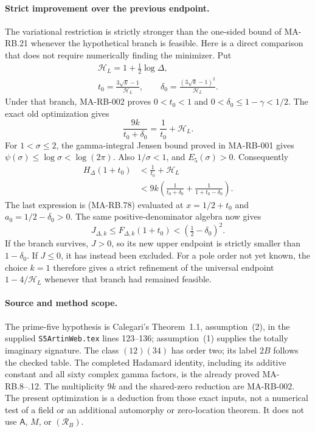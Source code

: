 \paragraph{Strict improvement over the previous endpoint.}
The variational restriction is strictly stronger than the
one-sided bound of MA-RB.21 whenever the hypothetical
branch is feasible.  Here is a direct comparison that
does not require numerically finding the minimizer.
Put
\[
 \begin{gathered}
 \mathcal H_L=1+\tfrac12\log\Delta,\\
 t_0=\frac{3\sqrt{k}-1}{\mathcal H_L},\qquad
 \delta_0=\frac{(3\sqrt{k}-1)^2}{\mathcal H_L}.
 \end{gathered}
 \tag{MA-RB.81}
\]
Under that branch, MA-RB-002 proves \(0<t_0<1\)
and \(0<\delta_0\le1-\gamma<1/2\).
The exact old optimization gives
\[
              \frac{9k}{t_0+\delta_0}
                            =\frac1{t_0}+\mathcal H_L.
 \tag{MA-RB.82}
\]
For \(1<\sigma\le2\), the gamma-integral Jensen
bound proved in MA-RB-001 gives
\(\psi(\sigma)\le\log\sigma<\log(2\pi)\).
Also \(1/\sigma<1\), and \(E_5(\sigma)>0\).
Consequently
\[
 \begin{split}
 H_\Delta(1+t_0)&<\frac1{t_0}+\mathcal H_L\\
       &<9k\left(\frac1{t_0+\delta_0}
                         +\frac1{1+t_0-\delta_0}\right).
 \end{split}
 \tag{MA-RB.83}
\]
The last expression is (MA-RB.78) evaluated at
\(x=1/2+t_0\) and \(a_0=1/2-\delta_0>0\).
The same positive-denominator algebra now gives
\[
 J_{\Delta,k}\le F_{\Delta,k}(1+t_0)
                         <(\tfrac12-\delta_0)^2.
 \tag{MA-RB.84}
\]
If the branch survives, \(J>0\), so its new upper
endpoint is strictly smaller than \(1-\delta_0\).
If \(J\le0\), it has instead been excluded.
For a pole order not yet known, the choice \(k=1\)
therefore gives a strict refinement of the universal
endpoint \(1-4/\mathcal H_L\) whenever that branch
had remained feasible.

\paragraph{Source and method scope.}
The prime-five hypothesis is Calegari's Theorem~1.1,
assumption~(2), in the supplied \texttt{S5ArtinWeb.tex}
lines 123--136; assumption~(1) supplies the totally
imaginary signature.  The class \((12)(34)\) has
order two; its label \(2B\) follows the checked table.
The completed Hadamard identity, including its additive
constant and all sixty complex gamma factors, is the
already proved MA-RB.8--.12.  The multiplicity \(9k\)
and the shared-zero reduction are MA-RB-002.
The present optimization is a deduction from those
exact inputs, not a numerical test of a field or an
additional automorphy or zero-location theorem.
It does not use \(\mathsf A\), \(M\), or
\((\mathcal R_B)\).
